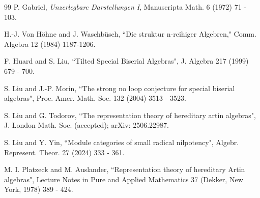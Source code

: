 \documentclass[10pt]{amsart}
\theoremstyle{definition}
\begin{document}
\begin{thebibliography}{99}
 P. Gabriel, \emph{Unzerlegbare Darstellungen I}, Manuscripta Math. 6 (1972) 71 - 103.

 {\sc H.-J. Von H\"{o}hne and J. Waschb\"{u}sch}, ``Die struktur
n-reihiger Algebren," Comm. Algebra 12 (1984) 1187-1206.

 {\sc F. Huard and S. Liu}, ``Tilted Special Biserial Algebras", J. Algebra 217 (1999) 679 - 700.







 {\sc S. Liu and J.-P. Morin,} ``The strong no loop conjecture for special biserial algebras", Proc. Amer. Math. Soc. 132 (2004) 3513 - 3523. 

 {\sc S. Liu and G. Todorov,} ``The representation theory of hereditary artin algebras", J. London Math. Soc. (accepted); arXiv: 2506.22987.

 {\sc S. Liu and Y. Yin}, ``Module categories of small radical nilpotency", Algebr. Represent. Theor. 27 (2024) 333 - 361.

 M. I. Platzeck and M. Auslander, ``Representation theory of hereditary Artin algebras", Lecture Notes in Pure and Applied Mathematics 37 (Dekker, New York, 1978) 389 - 424.



\end{thebibliography}
\end{document}
